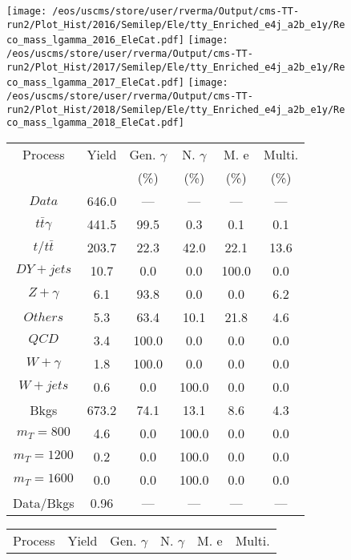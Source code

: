 \begin{figure}
\centering
\texttt{[image: /eos/uscms/store/user/rverma/Output/cms-TT-run2/Plot\_Hist/2016/Semilep/Ele/tty\_Enriched\_e4j\_a2b\_e1y/Reco\_mass\_lgamma\_2016\_EleCat.pdf]}
\texttt{[image: /eos/uscms/store/user/rverma/Output/cms-TT-run2/Plot\_Hist/2017/Semilep/Ele/tty\_Enriched\_e4j\_a2b\_e1y/Reco\_mass\_lgamma\_2017\_EleCat.pdf]}
\texttt{[image: /eos/uscms/store/user/rverma/Output/cms-TT-run2/Plot\_Hist/2018/Semilep/Ele/tty\_Enriched\_e4j\_a2b\_e1y/Reco\_mass\_lgamma\_2018\_EleCat.pdf]}
\begin{minipage}[c]{0.32\textwidth}
\centering
\tiny{
\begin{tabular}{cccccc}
\hline
Process & Yield & Gen. $\gamma$ & N. $\gamma$ & M. e & Multi. \\
 &  & (\%) & (\%) & (\%) & (\%)  \\
\hline
                                                                      $ Data $ &  646.0 &  --- &  --- &  --- &  ---\\
$ t\bar{t}\gamma $ &  441.5 &  99.5 &  0.3 &  0.1 &  0.1\\
$ t/t\bar{t} $ &  203.7 &  22.3 &  42.0 &  22.1 &  13.6\\
$ DY+jets $ &  10.7 &  0.0 &  0.0 &  100.0 &  0.0\\
$ Z+\gamma $ &  6.1 &  93.8 &  0.0 &  0.0 &  6.2\\
$ Others $ &  5.3 &  63.4 &  10.1 &  21.8 &  4.6\\
$ QCD $ &  3.4 &  100.0 &  0.0 &  0.0 &  0.0\\
$ W+\gamma $ &  1.8 &  100.0 &  0.0 &  0.0 &  0.0\\
$ W+jets $ &  0.6 &  0.0 &  100.0 &  0.0 &  0.0\\
Bkgs &  673.2 &  74.1 &  13.1 &  8.6 &  4.3\\
$ m_{T} = 800 $ &  4.6 &  0.0 &  100.0 &  0.0 &  0.0\\
$ m_{T} = 1200 $ &  0.2 &  0.0 &  100.0 &  0.0 &  0.0\\
$ m_{T} = 1600 $ &  0.0 &  0.0 &  100.0 &  0.0 &  0.0\\
Data/Bkgs &  0.96 &  --- &  --- &  --- &  ---\\
\hline
\end{tabular}
}
\end{minipage}
\begin{minipage}[c]{0.32\textwidth}
\centering
\tiny{
\begin{tabular}{cccccc}
\hline
Process & Yield & Gen. $\gamma$ & N. $\gamma$ & M. e & Multi. \\

\end{tabular}}
\end{minipage}
\end{figure}
